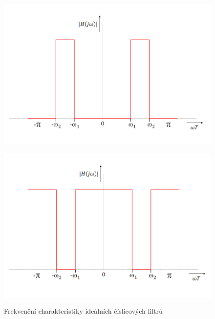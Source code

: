 \documentclass[a4paper, 12pt]{article}
\begin{document}
\begin{figure}[hbt!]
\begin{minipage}[b]{6.5cm}
\end{minipage}\vspace{0.8cm}
\begin{minipage}[b]{6.5cm}
  \centering
  \includegraphics[width=\linewidth]{passband.png}\\
\end{minipage}\hspace{0.5cm}
\begin{minipage}[b]{6.5cm}
  \centering
  \includegraphics[width=\linewidth]{bandstop.png}\\
\end{minipage}\vspace{0.4cm}
\caption{Frekvenční charakteristiky ideálních číslicových filtrů}
\label{fig:filtryfrekvs}
\end{figure}
\end{document}
